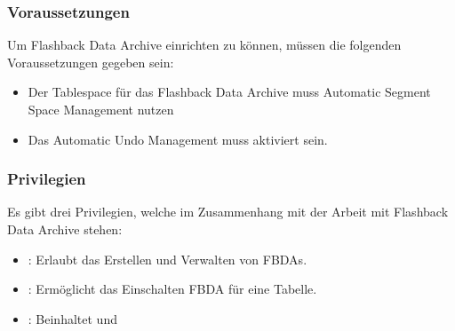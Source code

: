         \subsubsection{Voraussetzungen}
          Um Flashback Data Archive einrichten zu können, müssen die folgenden Voraussetzungen gegeben sein:
          \begin{itemize}
            \item Der Tablespace für das Flashback Data Archive muss Automatic Segment Space Management nutzen
            \item Das Automatic Undo Management muss aktiviert sein.
          \end{itemize}
        \subsubsection{Privilegien}
          Es gibt drei Privilegien, welche im Zusammenhang mit der Arbeit mit Flashback Data Archive stehen:
          \begin{itemize}
            \item {}: Erlaubt das Erstellen und Verwalten von FBDAs.
            \item {}: Ermöglicht das Einschalten FBDA für eine Tabelle.
            \item {}: Beinhaltet  und 
          \end{itemize}
